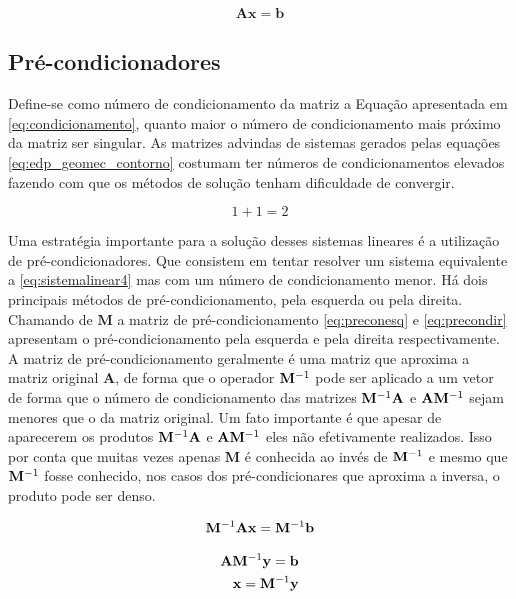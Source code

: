 \begin{equation} \label{eq:sistemalinear4}
    \mathbf{Ax = b}
\end{equation}

\subsection{Pré-condicionadores}

Define-se como número de condicionamento da matriz a Equação apresentada em \eqref{eq:condicionamento}, quanto maior o número de condicionamento mais próximo da matriz ser singular. As matrizes advindas de sistemas gerados pelas equações \eqref{eq:edp_geomec_contorno} costumam ter números de condicionamentos elevados fazendo com que os métodos de solução tenham dificuldade de convergir.

\begin{equation} \label{eq:condicionamento}
1+1=2
\end{equation}


Uma estratégia importante para a solução desses sistemas lineares é a utilização de pré-condicionadores. Que consistem em tentar resolver um sistema equivalente a \eqref{eq:sistemalinear4} mas com um número de condicionamento menor. Há dois principais métodos de pré-condicionamento, pela esquerda ou pela direita. Chamando de $\mathbf{M}$ a matriz de pré-condicionamento  \eqref{eq:preconesq} e \eqref{eq:precondir} apresentam o pré-condicionamento pela esquerda e pela direita respectivamente. A matriz de pré-condicionamento geralmente é uma matriz que aproxima a matriz original $\mathbf{A}$, de forma que o operador $\mathbf{M}^{-1}$ pode ser aplicado a um vetor de forma que o número de condicionamento das matrizes $\mathbf{M}^{-1} \mathbf{A}$ e $\mathbf{A} \mathbf{M}^{-1}$ sejam menores que o da matriz original. Um fato importante é que apesar de aparecerem os produtos $\mathbf{M}^{-1} \mathbf{A}$ e $\mathbf{A} \mathbf{M}^{-1}$ eles não efetivamente realizados. Isso por conta que muitas vezes apenas $\mathbf{M}$ é conhecida ao invés de $\mathbf{M}^{-1}$ e mesmo que $\mathbf{M}^{-1}$ fosse conhecido, nos casos dos pré-condicionares que aproxima a inversa, o produto pode ser denso. 


\begin{equation} \label{eq:preconesq}
\mathbf{M}^{-1} \mathbf{A} \mathbf{x}= \mathbf{M}^{-1} \mathbf{b}
\end{equation}

\begin{align} \label{eq:precondir}
\mathbf{A} \mathbf{M}^{-1} \mathbf{y} = \mathbf{b} \\
\mathbf{x} = \mathbf{M}^{-1} \mathbf{{y}}
\end{align}


